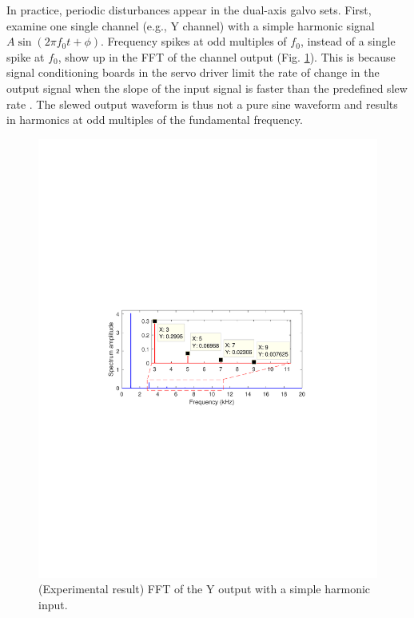 \documentclass [11pt, proquest] {uwthesis}[2020/02/24]
\begin{document}
In practice, periodic disturbances appear in the dual-axis galvo sets.
First, examine one single channel (e.g., Y channel) with a simple
harmonic signal $A\sin(2\pi f_{0}t+\phi)$. Frequency spikes at odd
multiples of $f_{0}$, instead of a single spike at $f_{0}$, show
up in the FFT of the channel output (Fig. \ref{fig:FFT-of-the-2}).
This is because signal conditioning boards in the servo driver limit
the rate of change in the output signal when the slope of the input
signal is faster than the predefined slew rate \cite{jung2005op}.
The slewed output waveform is thus not a pure sine waveform and results
in harmonics at odd multiples of the fundamental frequency.
\begin{figure}[!ht]
\begin{centering}
\includegraphics[width=13cm]{Fractional-order-RC/y_output}
\par\end{centering}
\caption{\label{fig:FFT-of-the-2}(Experimental result) FFT of the Y output
with a simple harmonic input.}
\end{figure}
\end{document}

